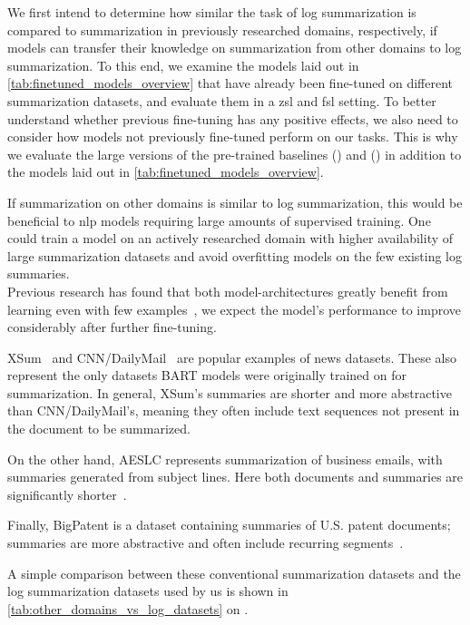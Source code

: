 We first intend to determine how similar the task of log summarization is compared to summarization in previously researched domains,
respectively, if models can transfer their knowledge on summarization from other domains to log summarization.
To this end, we examine the models laid out in \autoref{tab:finetuned_models_overview}
that have already been fine-tuned on different summarization datasets,
and evaluate them in a \acl{zsl} and \acl{fsl} setting.
To better understand whether previous fine-tuning has any positive effects,
we also need to consider how models not previously fine-tuned perform on our tasks.
This is why we evaluate the large versions of the pre-trained baselines
 () and  () in addition to the models laid out in \autoref{tab:finetuned_models_overview}.

If summarization on other domains is similar to log summarization,
this would be beneficial to \ac{nlp} models requiring large amounts of supervised training.
One could train a model on an actively researched domain with higher availability of large summarization datasets
and avoid overfitting models on the few existing log summaries.\\
Previous research has found that both model-architectures greatly benefit from learning even with few examples~\parencite[5642-5643]{summary_models_comparison},
we expect the model's performance to improve considerably after further fine-tuning.

XSum~\parencite{xsum} and CNN/DailyMail~\parencite{cnn_dailymail}
are popular examples of news datasets.
These also represent the only datasets BART models were originally trained on for summarization.
In general, XSum's summaries are shorter and more abstractive than CNN/DailyMail's,
meaning they often include text sequences not present in the document to be summarized.

On the other hand, AESLC represents summarization of business emails,
with summaries generated from subject lines.
Here both documents and summaries are significantly shorter~\parencite[447]{aeslc}.

Finally, BigPatent is a dataset containing summaries of U.S. patent documents;
summaries are more abstractive and often include recurring segments~\parencite[2204-2205]{bigpatent}.

A simple comparison between these conventional summarization datasets
and the log summarization datasets used by us is shown in
\autoref{tab:other_domains_vs_log_datasets} on .


